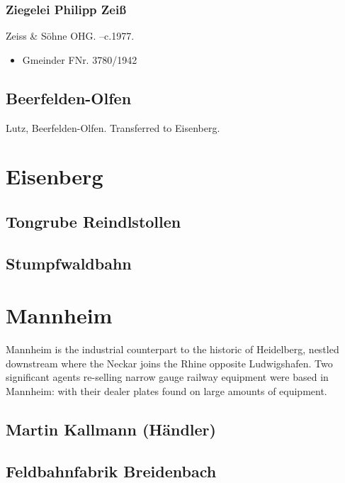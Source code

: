 \documentclass[a4paper]{report}
\begin{document}
\subsubsection{Ziegelei Philipp Zeiß}

Zeiss \& Söhne OHG.  --c.1977.

\begin{itemize}
\item Gmeinder FNr. 3780/1942
\end{itemize}

\subsection{Beerfelden-Olfen}

Lutz, Beerfelden-Olfen.  Transferred to Eisenberg.

\section{Eisenberg}

\subsection{Tongrube Reindlstollen}

\subsection{Stumpfwaldbahn}



\section{Mannheim}

Mannheim is the industrial counterpart to the historic of Heidelberg,
nestled downstream where the Neckar joins the Rhine opposite
Ludwigshafen.  Two significant agents re-selling narrow gauge railway
equipment were based in Mannheim: with their dealer plates found on
large amounts of equipment.

\subsection{Martin Kallmann (Händler)}

\subsection{Feldbahnfabrik Breidenbach}
\end{document}
